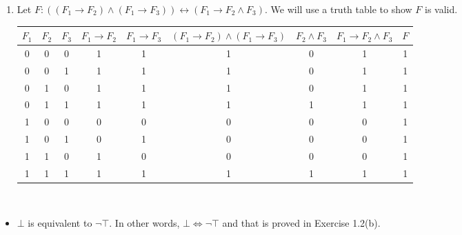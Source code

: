 \begin{exer}[1.2]
\begin{enumerate}[label=(\alph*)]
\begin{center}
            \end{center}
            \addtocounter{enumi}{4} %
        \item %
            Let $F: ((F_1 \rightarrow F_2) \land (F_1 \rightarrow F_3)) \leftrightarrow (F_1 \rightarrow F_2 \land F_3)$.
            We will use a truth table to show $F$ is valid.
            \begin{center}
                \begin{tabular}{ |c|c|c||c|c|c|c|c|c| }
                    \hline
                        $F_1$ & $F_2$ & $F_3$ & $F_1 \rightarrow F_2$ & $F_1 \rightarrow F_3$ & $(F_1 \rightarrow F_2) \land (F_1 \rightarrow F_3)$ &
                                $F_2 \land F_3$ & $F_1 \rightarrow F_2 \land F_3$ & $F$ \\
                    \hline
                        0 & 0 & 0 & 1 & 1 & 1 & 0 & 1 & 1  \\
                    \hline
                        0 & 0 & 1 & 1 & 1 & 1 & 0 & 1 & 1  \\
                    \hline
                        0 & 1 & 0 & 1 & 1 & 1 & 0 & 1 & 1  \\
                    \hline
                        0 & 1 & 1 & 1 & 1 & 1 & 1 & 1 & 1  \\
                    \hline
                        1 & 0 & 0 & 0 & 0 & 0 & 0 & 0 & 1  \\
                    \hline
                        1 & 0 & 1 & 0 & 1 & 0 & 0 & 0 & 1  \\
                    \hline
                        1 & 1 & 0 & 1 & 0 & 0 & 0 & 0 & 1  \\
                    \hline
                        1 & 1 & 1 & 1 & 1 & 1 & 1 & 1 & 1  \\
                    \hline
                \end{tabular}
            \end{center}
    \end{enumerate}
\end{exer}

\begin{exer}[1.3]
    $ $
    \begin{itemize}
        \item
            $\bot$ is equivalent to $\neg \top$.
            In other words, $\bot \Leftrightarrow \neg \top$ and that is proved in Exercise 1.2(b).
    \end{itemize}
\end{exer}

